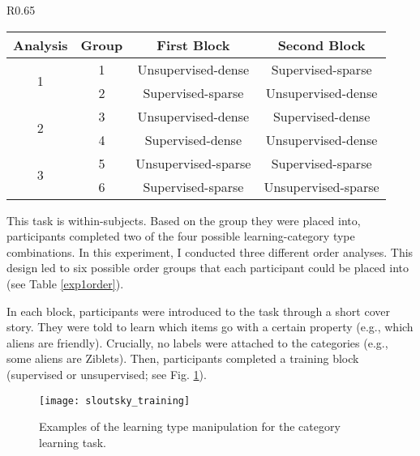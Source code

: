 \documentclass[../dissertation.tex]{subfiles}
\begin{document}
\begin{wraptable}[8]{R}{0.65\linewidth}
\vspace{-10pt}
\caption{Block orders for statistical density task.}
\vspace{-10pt}
\begin{center}
\begin{tabular}{cccc}
 \toprule
 Analysis & Group & First Block & Second Block \\ 
 \midrule
 \multirow{2}{*}{1} & 1 & Unsupervised-dense & Supervised-sparse \\ 
 & 2 & Supervised-sparse & Unsupervised-dense \\ 
 \midrule
  \multirow{2}{*}{2} & 3 & Unsupervised-dense & Supervised-dense \\ 
 & 4 & Supervised-dense & Unsupervised-dense \\
 \midrule
  \multirow{2}{*}{3} & 5 & Unsupervised-sparse & Supervised-sparse \\ 
 & 6 & Supervised-sparse & Unsupervised-sparse \\ 
 \bottomrule 
\end{tabular}
\end{center}
\vspace{-20pt}
\label{exp1order}
\end{wraptable} \par

	This task is within-subjects. Based on the group they were placed into, participants completed two of the four possible learning-category type combinations. In this experiment, I conducted three different order analyses. This design led to six possible order groups that each participant could be placed into (see Table \ref{exp1order}). \par
 In each block, participants were introduced to the task through a short cover story. They were told to learn which items go with a certain property (e.g., which aliens are friendly). Crucially, no labels were attached to the categories (e.g., some aliens are Ziblets). Then, participants completed a training block (supervised or unsupervised; see Fig. \ref{sloutskytraining}). 

\begin{figure}[h]
\begin{center}
\texttt{[image: sloutsky\_training]}
\caption[Training conditions in category learning task]{Examples of the learning type manipulation for the category learning task.}
\vspace{-10pt}
\label{sloutskytraining}
\end{center}
\end{figure}
 
\end{document}
